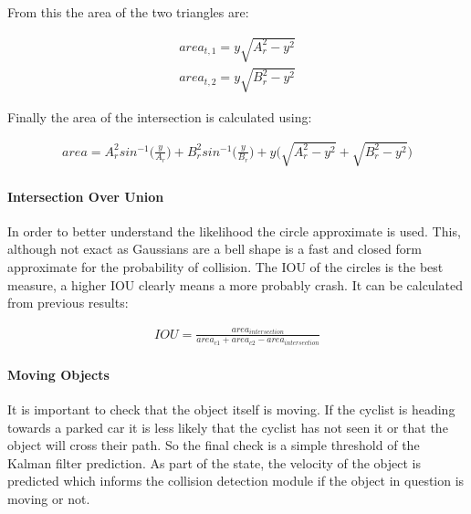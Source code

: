 \documentclass[11pt,twoside]{report}
\begin{document}
From this the area of the two triangles are:

\begin{equation}
\begin{aligned}
area_{t,1} = y \sqrt{A_{r}^{2} - y^{2}} \\
area_{t,2} = y \sqrt{B_{r}^{2} - y^{2}}
\end{aligned}
\label{circle_area_eq1}
\end{equation}


Finally the area of the intersection is calculated using:

\begin{equation}
\begin{aligned}
area = A_{r}^{2}sin^{-1} \big ( \frac{y}{A_{r}}) + B_{r}^{2}sin^{-1} \big ( \frac{y}{B_{r}}) + y \bigg ( \sqrt{A_{r}^{2} - y^{2}} + \sqrt{B_{r}^{2} - y^{2}} \bigg )
\end{aligned}
\label{circle_area_eq1}
\end{equation}

\paragraph{Intersection Over Union}
In order to better understand the likelihood the circle approximate is used. This, although not exact as Gaussians are a bell shape is a fast and closed form approximate for the probability of collision. The IOU of the circles is the best measure, a higher IOU clearly means a more probably crash. It can be calculated from previous results:


\begin{equation}
\begin{aligned}
IOU = \frac{area_{intersection}}{ area_{c1} + area_{c2} - area_{intersection}}
\end{aligned}
\label{circle_area_eq1}
\end{equation}

\paragraph{Moving Objects}
It is important to check that the object itself is moving. If the cyclist is heading towards a parked car it is less likely that the cyclist has not seen it or that the object will cross their path. So the final check is a simple threshold of the Kalman filter prediction. As part of the state, the velocity of the object is predicted which informs the collision detection module if the object in question is moving or not.
\end{document}
